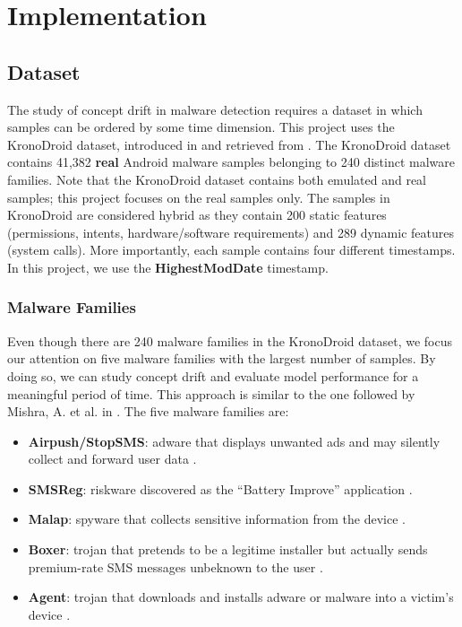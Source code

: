 \chapter{Implementation}
\section{Dataset\label{sec:dataset}}
The study of concept drift in malware detection requires a dataset in which samples
can be ordered by some time dimension. This project uses the KronoDroid dataset, introduced in
\cite{guerra2021kronodroid} and retrieved from \cite{guerra2021github}.
The KronoDroid dataset contains 41,382 \textbf{real}
Android malware samples belonging to 240 distinct malware families.
Note that the KronoDroid dataset contains both emulated and real samples; this project
focuses on the real samples only. The samples in KronoDroid are considered
hybrid as they contain 200 static features
(permissions, intents, hardware/software requirements) and
289 dynamic features (system calls).
More importantly, each sample contains four different timestamps.
In this project, we use the \textbf{HighestModDate} timestamp.

\subsection{Malware Families}
Even though there are 240 malware families in the KronoDroid dataset, we focus our attention
on five malware families with the largest number of samples. By doing so, we can
study concept drift and evaluate model performance for a meaningful period of time.
This approach is similar to the one followed by Mishra, A. et al. in \cite{mishra2024cluster}.
The five malware families are:
\begin{itemize}
    \item \textbf{Airpush/StopSMS}: adware that displays unwanted ads and may silently collect
    and forward user data \cite{fsecure2025airpush}. 
    \item \textbf{SMSReg}: riskware discovered as the ``Battery Improve'' application \cite{fsecure2025smsreg}.
    \item \textbf{Malap}: spyware that collects sensitive information from the device \cite{guerra2021kronodroid}.
    \item \textbf{Boxer}: trojan that pretends to be a legitime installer but actually sends premium-rate
    SMS messages unbeknown to the user \cite{fsecure2025boxer}.
    \item \textbf{Agent}: trojan that downloads and installs adware or malware into a victim's
    device \cite{fsecure2025agent}.
\end{itemize}

